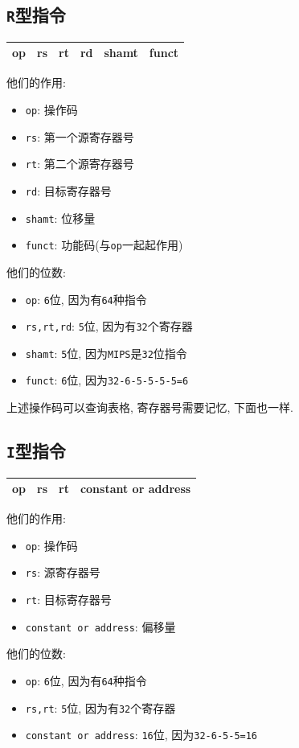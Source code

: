 \subsection{\texttt{R}型指令}
\begin{table}[H]
\centering
\begin{tabularx}{\textwidth}{|Z|Z|Z|Z|Z|Z|}
\hline
op & rs & rt & rd & shamt & funct  \\
\hline
\end{tabularx}
\end{table} \par 
他们的作用:
\begin{itemize}
\item \verb|op|: 操作码
\item \verb|rs|: 第一个源寄存器号
\item \verb|rt|: 第二个源寄存器号
\item \verb|rd|: 目标寄存器号
\item \verb|shamt|: 位移量
\item \verb|funct|: 功能码(与\verb|op|一起起作用)
\end{itemize} \par 
他们的位数:
\begin{itemize}
\item \verb|op|: \verb|6|位, 因为有\verb|64|种指令
\item \verb|rs,rt,rd|: \verb|5|位, 因为有\verb|32|个寄存器
\item \verb|shamt|: \verb|5|位, 因为\texttt{MIPS}是\verb|32|位指令
\item \verb|funct|: \verb|6|位, 因为\verb|32-6-5-5-5-5=6|
\end{itemize}\par
上述操作码可以查询表格, 寄存器号需要记忆, 下面也一样.
\subsection{\texttt{I}型指令}
\begin{table}[H]
\centering
\begin{tabularx}{\textwidth}{|Z|Z|Z|p{15em}<{\centering}|}
\hline
op & rs & rt & constant or address \\
\hline
\end{tabularx}
\end{table}\par
他们的作用:
\begin{itemize}
\item \verb|op|: 操作码
\item \verb|rs|: 源寄存器号
\item \verb|rt|: 目标寄存器号
\item \verb|constant or address|: 偏移量
\end{itemize}\par
他们的位数:
\begin{itemize}
\item \verb|op|: \verb|6|位, 因为有\verb|64|种指令
\item \verb|rs,rt|: \verb|5|位, 因为有\verb|32|个寄存器
\item \verb|constant or address|: \verb|16|位, 因为\verb|32-6-5-5=16|
\end{itemize}
